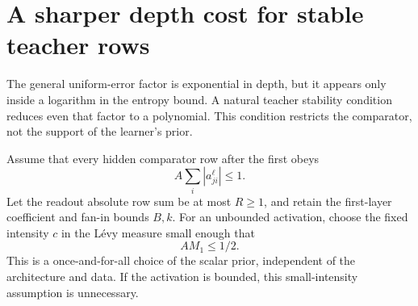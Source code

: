 \section{A sharper depth cost for stable teacher rows}
\label{sec:stable-dag}
The general uniform-error factor is exponential in depth, but it appears only inside a logarithm in the entropy bound. A natural teacher stability condition reduces even that factor to a polynomial. This condition restricts the comparator, not the support of the learner's prior.

Assume that every hidden comparator row after the first obeys
\[
 A\sum_i|a_{ji}^\ell|\le1.
\]
Let the readout absolute row sum be at most $R\ge1$, and retain the first-layer coefficient and fan-in bounds $B,k$. For an unbounded activation, choose the fixed intensity $c$ in the L\'evy measure small enough that
\[
 AM_1\le1/2.
\]
This is a once-and-for-all choice of the scalar prior, independent of the architecture and data. If the activation is bounded, this small-intensity assumption is unnecessary.

